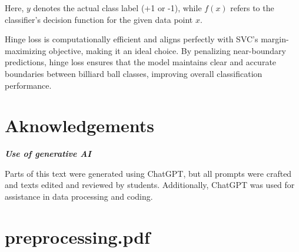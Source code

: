 \documentclass{article}
\begin{document}
Here, $y$ denotes the actual class label (+1 or -1), while $f(x)$ refers to the classifier's decision function for the given data point $x$.

Hinge loss is computationally efficient and aligns perfectly with SVC's margin-maximizing objective, making it an ideal choice. By penalizing 
near-boundary predictions, hinge loss ensures that the model maintains clear and accurate boundaries between billiard ball classes, improving 
overall classification performance. \cite{unknownMachineLearningApproach2023, bartlettClassificationRejectOption2008}

\pagebreak
\section{Aknowledgements}
\textbf{\textit{Use of generative AI}}

Parts of this text were generated using ChatGPT, but all prompts were crafted and texts edited and reviewed by students. Additionally, 
ChatGPT was used for assistance in data processing and coding.


\printbibliography


\appendix
\section{preprocessing.pdf}


\end{document}
